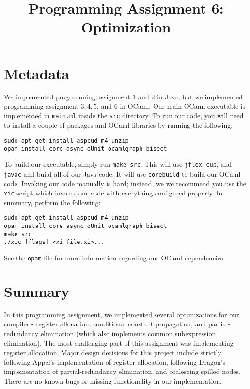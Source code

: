 \documentclass{hw}
\title{Programming Assignment 6:\\ Optimization}
\begin{document}
\maketitle

\section{Metadata}\label{sec:metadata}
We implemented programming assignment $1$ and $2$ in Java, but we implemented
programming assignment $3,4,5$, and $6$ in OCaml. Our main OCaml executable is
implemented in \texttt{main.ml} inside the \texttt{src} directory. To run our
code, you will need to install a couple of packages and OCaml libraries by
running the following:

\begin{center}
\begin{BVerbatim}
sudo apt-get install aspcud m4 unzip
opam install core async oUnit ocamlgraph bisect
\end{BVerbatim}
\end{center}

To build our executable, simply run \texttt{make src}. This will use
\texttt{jflex}, \texttt{cup}, and \texttt{javac} and build all of our Java
code. It will use \texttt{corebuild} to build our OCaml code. Invoking our
code manually is hard; instead, we we recommend you use the \texttt{xic} script
which invokes our code with everything configured properly. 
In summary, perform the following:

\begin{center}
\begin{BVerbatim}
sudo apt-get install aspcud m4 unzip
opam install core async oUnit ocamlgraph bisect
make src
./xic [flags] <xi_file.xi>...
\end{BVerbatim}
\end{center}

See the \texttt{opam} file for more information regarding our OCaml dependencies.


\section{Summary}\label{sec:summary}
In this programming assignment, we implemented several optimizations for our compiler - register allocation, conditional constant propagation, and partial-redundancy elimination (which also implements common subexpression elimination).
The most challenging part of this assignment was implementing register allocation. Major design decisions for this project include strictly following Appel's implementation of register allocation, following Dragon's implementation of partial-redundancy elimination, and coalescing spilled nodes.
There are no known bugs or missing functionality in our implementation.
\end{document}
